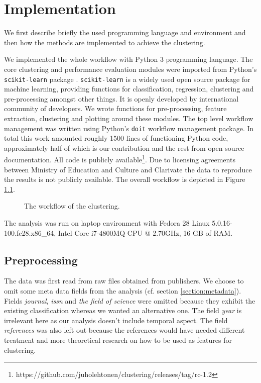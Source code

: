 \chapter{Implementation}
\label{chapter:implementation}


We first describe briefly the used programming language and 
environment and then how the methods are implemented to achieve the 
clustering. 

We implemented the whole workflow with Python 3 programming 
language. The core clustering and performance evaluation modules
were imported from Python's \texttt{scikit-learn} package 
\cite{scikit-learn}. \texttt{scikit-learn} is a widely used open 
source package for machine learning, providing functions for 
classification, regression, clustering and pre-processing amongst 
other things. It is openly developed by international community of
developers. We wrote functions for pre-processing, feature 
extraction, clustering and plotting around these modules. 
The top level workflow management was written using Python's 
\texttt{doit} workflow management package. In total this work 
amounted roughly 1500 lines of functioning Python code, 
approximately half of which is our contribution and the rest from 
open source documentation. All code is publicly 
available\footnote{https://github.com/juholehtonen/clustering/releases/tag/rc-1.2}.
Due to licensing agreements between Ministry of Education and 
Culture and Clarivate the data to reproduce the results is not 
publicly available. The overall workflow is depicted in Figure 
\ref{fig:wf}.
\begin{figure}[ht]
  \begin{center}    
    
    \caption{The workflow of the clustering.}
    \label{fig:wf}
  \end{center}
\end{figure}
The analysis was run on laptop environment with Fedora 28 Linux 
5.0.16-100.fc28.x86\_64, Intel Core i7-4800MQ CPU @ 2.70GHz, 16 GB
of RAM.

\section{Preprocessing}
\label{sec:impl_preproc}
The data was first read from raw files obtained from publishers. 
We choose to omit some meta data fields from the analysis (cf. 
section \ref{section:metadata}). Fields \emph{journal}, 
\emph{issn} and \emph{the field of science} were omitted because 
they exhibit the existing classification whereas we wanted an 
alternative one. The field \emph{year} is irrelevant here as our 
analysis doesn't include temporal aspect. The field 
\emph{references} was also left out because the references 
would have needed different treatment and more theoretical research 
on how to be used as features for clustering.

